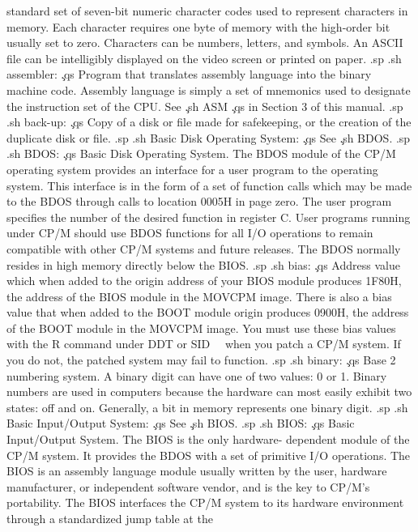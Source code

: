 standard set of seven-bit numeric character codes used to 
represent characters in memory.  Each character requires one byte 
of memory with the high-order bit usually set to zero.  
Characters can be numbers, letters, and symbols.  An ASCII file can be 
intelligibly displayed on the video screen or printed on paper.
.sp
.sh
assembler:  \c
.qs
Program that translates assembly language into the binary machine 
code.  Assembly language is simply a set of mnemonics used to 
designate the instruction set of the CPU.  See \c
.sh
ASM \c
.qs
in Section 3 of this manual.
.sp
.sh
back-up:  \c
.qs
Copy of a disk or file made for safekeeping, or the creation of 
the duplicate disk or file.
.sp
.sh
Basic Disk Operating System:  \c
.qs
See \c
.sh
BDOS.
.sp
.sh
BDOS:  \c
.qs
Basic Disk Operating System.  The BDOS module of the CP/M 
operating system provides an interface for a user program to the 
operating system.  This interface is in the form of a set of 
function calls which may be made to the BDOS through calls to 
location 0005H in page zero.  The user program specifies the 
number of the desired function in register C.  User programs 
running under CP/M should use BDOS functions for all I/O 
operations to remain compatible with other CP/M systems and 
future releases.  The BDOS normally resides in high memory 
directly below the BIOS. 
.sp
.sh
bias:  \c
.qs
Address value which when added to the origin address of your BIOS 
module produces 1F80H, the address of the BIOS module in the 
MOVCPM image.  There is also a bias value that when added to the 
BOOT module origin produces 0900H, the address of the BOOT module 
in the MOVCPM image.  You must use these bias values with the R 
command under DDT or SID \ \ when you patch a CP/M system.  If you do 
not, the patched system may fail to function.
.sp
.sh
binary:  \c
.qs
Base 2 numbering system.  A binary digit can have one of two 
values:  0 or 1.  Binary numbers are used in computers because 
the hardware can most easily exhibit two states:  off and on. 
Generally, a bit in memory represents one binary digit.
.sp
.sh
Basic Input/Output System:  \c
.qs
See \c
.sh
BIOS.
.sp
.sh
BIOS:  \c
.qs
Basic Input/Output System.  The BIOS is the only hardware-
dependent module of the CP/M system.  It provides the BDOS with a 
set of primitive I/O operations.  The BIOS is an assembly 
language module usually written by the user, hardware 
manufacturer, or independent software vendor, and is the key to 
CP/M's portability.  The BIOS interfaces the CP/M system to its 
hardware environment through a standardized jump table at the 
